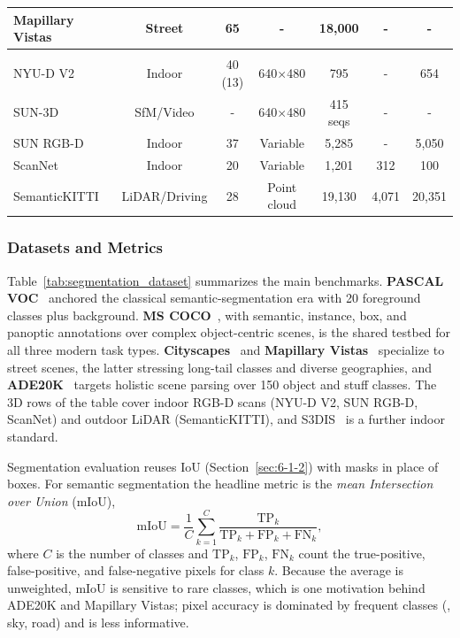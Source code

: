 \begin{table}[!t]
\begin{tabular}{l c cc ccc }
Mapillary Vistas~\cite{neuhold2017mapillary} & Street & 65 & - & 18,000 & - & - \\
\hline
\rowcolor{lightgrey}\multicolumn{7}{l}{$\bullet$ \textit{3D}}\\
NYU-D V2~\cite{silberman2012nyudv2} & Indoor & 40 (13) & 640$\times$480 & 795 & - & 654 \\
SUN-3D~\cite{xiao2013sun3d} & SfM/Video & - & 640$\times$480 & 415 seqs & - & - \\
SUN RGB-D~\cite{song2015sunrgbd} & Indoor & 37 & Variable & 5,285 & - & 5,050 \\
ScanNet~\cite{dai2017scannet} & Indoor & 20 & Variable & 1,201 & 312 & 100 \\
SemanticKITTI~\cite{SemanticKITTI-BehleyGMQBSG19} & LiDAR/Driving & 28 & Point cloud & 19,130 & 4,071 & 20,351 \\
\bottomrule
\end{tabular}
\end{table}

\subsubsection{Datasets and Metrics}
Table~\ref{tab:segmentation_dataset} summarizes the main benchmarks. \textbf{PASCAL VOC}~\cite{everingham2010pascal} anchored the classical semantic-segmentation era with 20 foreground classes plus background. \textbf{MS COCO}~\cite{lin2014microsoft}, with semantic, instance, box, and panoptic annotations over complex object-centric scenes, is the shared testbed for all three modern task types. \textbf{Cityscapes}~\cite{cordts2016cityscapes} and \textbf{Mapillary Vistas}~\cite{neuhold2017mapillary} specialize to street scenes, the latter stressing long-tail classes and diverse geographies, and \textbf{ADE20K}~\cite{zhou2017ade20k} targets holistic scene parsing over 150 object and stuff classes. The 3D rows of the table cover indoor RGB-D scans (NYU-D V2, SUN RGB-D, ScanNet) and outdoor LiDAR (SemanticKITTI), and S3DIS~\cite{armeni2016s3dis} is a further indoor standard.

Segmentation evaluation reuses IoU (Section~\ref{sec:6-1-2}) with masks in place of boxes. For semantic segmentation the headline metric is the \emph{mean Intersection over Union} (mIoU),
\begin{equation}
\mathrm{mIoU} = \frac{1}{C} \sum_{k=1}^{C} \frac{\mathrm{TP}_k}{\mathrm{TP}_k + \mathrm{FP}_k + \mathrm{FN}_k},
\end{equation}
where $C$ is the number of classes and $\mathrm{TP}_k$, $\mathrm{FP}_k$, $\mathrm{FN}_k$ count the true-positive, false-positive, and false-negative pixels for class $k$.
Because the average is unweighted, mIoU is sensitive to rare classes, which is one motivation behind ADE20K and Mapillary Vistas; pixel accuracy is dominated by frequent classes (\eg, sky, road) and is less informative.

